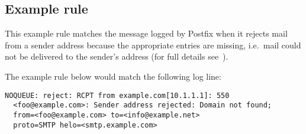 \documentclass[a4paper,12pt,draft]{article}
\begin{document}
\subsection{Example rule}

\label{example rule}

This example rule matches the message logged by Postfix when it rejects
mail from a sender address because the appropriate \DNS{} entries are
missing, i.e.\ mail could not be delivered to the sender's address (for
full details see~\cite{reject-unknown-sender-domain}).

The example rule below would match the following log line:

\begin{verbatim}
NOQUEUE: reject: RCPT from example.com[10.1.1.1]: 550
  <foo@example.com>: Sender address rejected: Domain not found;
  from=<foo@example.com> to=<info@example.net>
  proto=SMTP helo=<smtp.example.com>
\end{verbatim}
\end{document}

